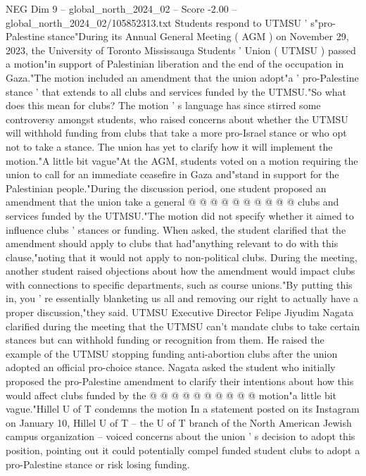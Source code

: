 \begin{textsample}{NEG Dim 9 – global\_north\_2024\_02 – Score -2.00 – global\_north\_2024\_02/105852313.txt}  \label{ex:f9_neg_238}
Students respond to UTMSU ' s"pro-Palestine stance"During its Annual General Meeting ( AGM ) on November 29, 2023, the University of Toronto Mississauga Students ' Union ( UTMSU ) passed a motion"in support of Palestinian liberation and the end of the occupation in Gaza."The motion included an amendment that the union adopt"a ' pro-Palestine stance ' that extends to all clubs and services funded by the UTMSU."So what does this mean for clubs?
The motion ' s language has since stirred some controversy amongst students, who raised concerns about whether the UTMSU will withhold funding from clubs that take a more pro-Israel stance or who opt not to take a stance.
The union has yet to clarify how it will implement the motion."A little bit vague"At the AGM, students voted on a motion requiring the union to call for an immediate ceasefire in Gaza and"stand in support for the Palestinian people."During the discussion period, one student proposed an amendment that the union take a general @ @ @ @ @ @ @ @ @ @ clubs and services funded by the UTMSU."The motion did not specify whether it aimed to influence clubs ' stances or funding.
When asked, the student clarified that the amendment should apply to clubs that had"anything relevant to do with this clause,"noting that it would not apply to non-political clubs.
During the meeting, another student raised objections about how the amendment would impact clubs with connections to specific departments, such as course unions."By putting this in, you ' re essentially blanketing us all and removing our right to actually have a proper discussion,"they said.
UTMSU Executive Director Felipe Jiyudim Nagata clarified during the meeting that the UTMSU can't mandate clubs to take certain stances but can withhold funding or recognition from them.
He raised the example of the UTMSU stopping funding anti-abortion clubs after the union adopted an official pro-choice stance.
Nagata asked the student who initially proposed the pro-Palestine amendment to clarify their intentions about how this would affect clubs funded by the @ @ @ @ @ @ @ @ @ @ motion"a little bit vague."Hillel U of T condemns the motion In a statement posted on its Instagram on January 10, Hillel U of T -- the U of T branch of the North American Jewish campus organization -- voiced concerns about the union ' s decision to adopt this position, pointing out it could potentially compel funded student clubs to adopt a pro-Palestine stance or risk losing funding.

\end{textsample}
